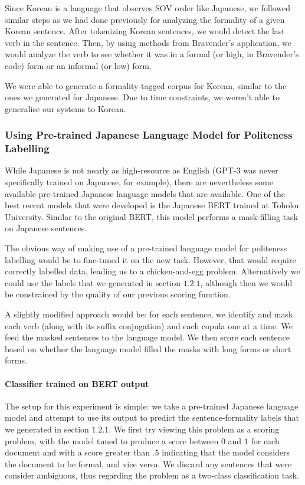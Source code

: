 \documentclass[11pt]{article}
\begin{document}
Since Korean is a language that observes SOV order like Japanese, we followed similar steps as we had done previously for analyzing the formality of a given Korean sentence. After tokenizing Korean sentences, we would detect the last verb in the sentence. Then, by using methods from Bravender's application, we would analyze the verb to see whether it was in a formal (or high, in Bravender's code) form or an informal (or low) form.

We were able to generate a formality-tagged corpus for Korean, similar to the ones we generated for Japanese. Due to time constraints, we weren't able to generalise our systems to Korean.

\subsubsection{Using Pre-trained Japanese Language Model for Politeness Labelling}

While Japanese is not nearly as high-resource as English (GPT-3 was never specifically trained on Japanese, for example), there are nevertheless some available pre-trained Japanese language models that are available. One of the best recent models that were developed is the Japanese BERT trained at Tohoku University. Similar to the original BERT, this model performs a mask-filling task on Japanese sentences. 

The obvious way of making use of a pre-trained language model for politeness labelling would be to fine-tuned it on the new task. However, that would require correctly labelled data, leading us to a chicken-and-egg problem. Alternatively we could use the labels that we generated in section $1.2.1$, although then we would be constrained by the quality of our previous scoring function.

A slightly modified approach would be: for each sentence, we identify and mask each verb (along with its suffix conjugation) and each copula one at a time. We feed the masked sentences to the language model. We then score each sentence based on whether the language model filled the masks with long forms or short forms.

\paragraph{Classifier trained on BERT output}

The setup for this experiment is simple: we take a pre-trained Japanese language model and attempt to use its output to predict the sentence-formality labels that we generated in section $1.2.1$. We first try viewing this problem as a scoring problem, with the model tuned to produce a score between $0$ and $1$ for each document and with a score greater than $.5$ indicating that the model considers the document to be formal, and vice versa. We discard any sentences that were consider ambiguous, thus regarding the problem as a two-class classification task. 
\end{document}
